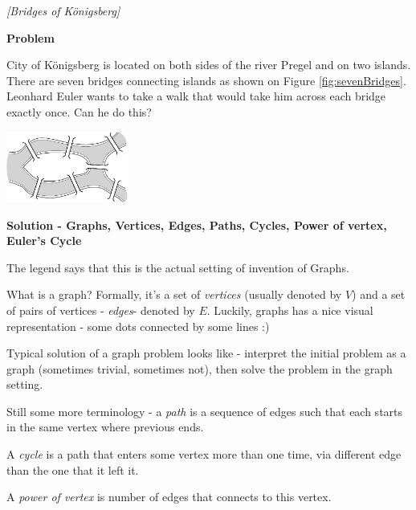 

%




\noindent 

\begin{problem}
\textit{[Bridges of Königsberg]}

\textbf{Problem}

City of Königsberg is located on both sides of the river Pregel and on two islands. There are seven bridges connecting islands as shown on Figure \ref{fig:sevenBridges}. Leonhard Euler wants to take a walk that would take him across each bridge exactly once. Can he do this? 

\begin{center}
\includegraphics[width=4cm]{euler2.png}
\label{fig:sevenBridges}
\end{center} 

\textbf{Solution - Graphs, Vertices, Edges, Paths, Cycles, Power of vertex, Euler's Cycle}

The legend says that this is the actual setting of invention of Graphs. 

What is a graph? Formally, it's a set of \textit{vertices} (usually denoted by $V$) and a set of pairs of vertices - \textit{edges}- denoted by $E$. Luckily, graphs has a nice visual representation - some dots connected by some lines :)

Typical solution of a graph problem looks like - interpret the initial problem as a graph (sometimes trivial, sometimes not), then solve the problem in the graph setting. 

Still some more terminology - a \textit{path} is a sequence of edges such that each starts in the same vertex where previous ends. 

A \textit{cycle} is a path that enters some vertex more than one time, via different edge than the one that it left it. 

A \textit{power of vertex} is number of edges that connects to this vertex.  


\end{problem}
